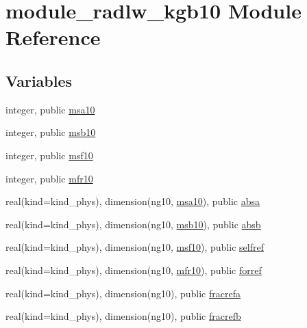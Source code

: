 \hypertarget{namespacemodule__radlw__kgb10}{}\section{module\+\_\+radlw\+\_\+kgb10 Module Reference}
\label{namespacemodule__radlw__kgb10}
\subsection*{Variables}
\begin{DoxyCompactItemize}
\item 
integer, public \hyperlink{namespacemodule__radlw__kgb10_a2305b922082d1cc367276b636f09fb6c}{msa10}
\item 
integer, public \hyperlink{group__module__radlw__main_gaf33570d793ca152588c14ce30ac30798}{msb10}
\item 
integer, public \hyperlink{group__module__radlw__main_ga1b69c6fe99ed4ebc7b3d78b8f842b880}{msf10}
\item 
integer, public \hyperlink{group__module__radlw__main_ga0f3944c4b86044e0c5db3dc351226c88}{mfr10}
\item 
real(kind=kind\+\_\+phys), dimension(ng10, \hyperlink{namespacemodule__radlw__kgb10_a2305b922082d1cc367276b636f09fb6c}{msa10}), public \hyperlink{group__module__radlw__main_ga14f18538f77c1a3d651e36acf90baa19}{absa}
\item 
real(kind=kind\+\_\+phys), dimension(ng10, \hyperlink{group__module__radlw__main_gaf33570d793ca152588c14ce30ac30798}{msb10}), public \hyperlink{group__module__radlw__main_gaf1e2252355a3002080be21ce37d45c3a}{absb}
\item 
real(kind=kind\+\_\+phys), dimension(ng10, \hyperlink{group__module__radlw__main_ga1b69c6fe99ed4ebc7b3d78b8f842b880}{msf10}), public \hyperlink{group__module__radlw__main_ga48247dea283a611ebe57dd1c164dda69}{selfref}
\item 
real(kind=kind\+\_\+phys), dimension(ng10, \hyperlink{group__module__radlw__main_ga0f3944c4b86044e0c5db3dc351226c88}{mfr10}), public \hyperlink{group__module__radlw__main_gaf70e39048d571053790289549dd8333a}{forref}
\item 
real(kind=kind\+\_\+phys), dimension(ng10), public \hyperlink{group__module__radlw__main_gaa8bbfdaf370e12ae26d2ee3c464bdbc2}{fracrefa}
\item 
real(kind=kind\+\_\+phys), dimension(ng10), public \hyperlink{group__module__radlw__main_ga07d5bac00d30f1ab873a0542b28d7e83}{fracrefb}
\end{DoxyCompactItemize}


